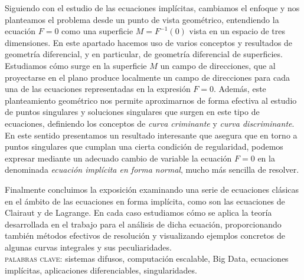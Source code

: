 Siguiendo con el estudio de las ecuaciones implícitas, cambiamos el enfoque y nos planteamos el problema desde un punto de vista geométrico, entendiendo la ecuación $F=0$ como una superficie $M=F^{-1}(0)$ vista en un espacio de tres dimensiones. En este apartado hacemos uso de varios conceptos y resultados de geometría diferencial, y en particular, de geometría diferencial de superficies. Estudiamos cómo surge en la superficie $M$ un campo de direcciones, que al proyectarse en el plano produce localmente un campo de direcciones para cada una de las ecuaciones representadas en la expresión $F=0$. Además, este planteamiento geométrico nos permite aproximarnos de forma efectiva al estudio de puntos singulares y soluciones singulares que surgen en este tipo de ecuaciones, definiendo los conceptos de \textit{curva criminante} y \textit{curva discriminante}. En este sentido presentamos un resultado interesante que asegura que en torno a puntos singulares que cumplan una cierta condición de regularidad, podemos expresar mediante un adecuado cambio de variable la ecuación $F=0$ en la denominada \textit{ecuación implícita en forma normal}, mucho más sencilla de resolver.

Finalmente concluimos la exposición examinando una serie de ecuaciones clásicas en el ámbito de las ecuaciones en forma implícita, como son las ecuaciones de Clairaut y de Lagrange. En cada caso estudiamos cómo se aplica la teoría desarrollada en el trabajo para el análisis de dicha ecuación, proporcionando también métodos efectivos de resolución y visualizando ejemplos concretos de algunas curvas integrales y sus peculiaridades.\\

\noindent\textsc{palabras clave:} sistemas difusos, computación escalable, Big Data, ecuaciones implícitas, aplicaciones diferenciables, singularidades.
